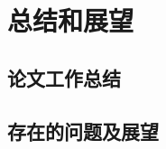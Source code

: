 \chapter{总结和展望}
\section{论文工作总结}
\section{存在的问题及展望}



\ifx\usechapbib\empty
\nocite{BSTcontrol}
\setcounter{NAT@ctr}{0}


\fi